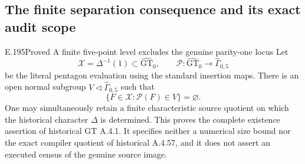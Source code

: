 \subsection{The finite separation consequence and its exact audit scope}

\begin{result}{E.195}{Proved}
{A finite five-point level excludes the genuine parity-one locus}
Let
\[
 \mathcal X=\Delta^{-1}(1)\subset\widehat{\mathrm{GT}}_0,
 \qquad
 \mathcal P:\widehat{\mathrm{GT}}_0
                      \longrightarrow\widehat\Gamma_{0,5}
\tag{E.195.1}
\]
be the literal pentagon evaluation using the standard
insertion maps.  There is an open normal subgroup
\(V\triangleleft\widehat\Gamma_{0,5}\) such that
\[
          \{F\in\mathcal X:\mathcal P(F)\in V\}
                            =\varnothing .
\tag{E.195.2}
\]
One may simultaneously retain a finite characteristic
source quotient on which the historical character
\(\Delta\) is determined.  This proves the complete
existence assertion of historical GT A.4.1.
It specifies neither a numerical size bound nor
the exact compiler quotient of historical A.4.57,
and it does not assert an executed census of the
genuine source image.
\end{result}

